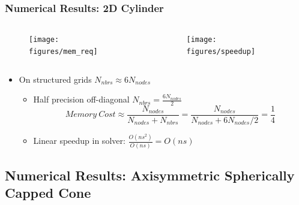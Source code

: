 \documentclass{beamer}
\begin{document}
\begin{frame}
  \frametitle{Numerical Results: 2D Cylinder}
  \begin{columns}[t]
    \begin{column}{0.5\textwidth}
    \begin{figure}[h]
      \centering
      \texttt{[image: figures/mem\_req]}
    \end{figure}
    \end{column}
    \begin{column}{0.5\textwidth}
      \begin{figure}[h]
        \centering
        \texttt{[image: figures/speedup]} 
      \end{figure}
    \end{column}
  \end{columns}
  \begin{itemize}
    \item On structured grids $N_{nbrs} \approx 6 N_{nodes}$
    \begin{itemize}
      \item Half precision off-diagonal $N_{nbrs} = \frac{6N_{nodes}}{2}$
        \[ 
          Memory\ Cost \approx 
           \frac{N_{nodes}}{N_{nodes} + N_{nbrs}} =
           \frac{N_{nodes}}{N_{nodes} + 6N_{nodes}/2} = \frac{1}{4}
        \]
      \item Linear speedup in solver: $\frac{O(ns^2)}{O(ns)} = O(ns)$
    \end{itemize}
  \end{itemize}
\end{frame}

\subsection{Numerical Results: Axisymmetric Spherically Capped Cone}
\end{document}
